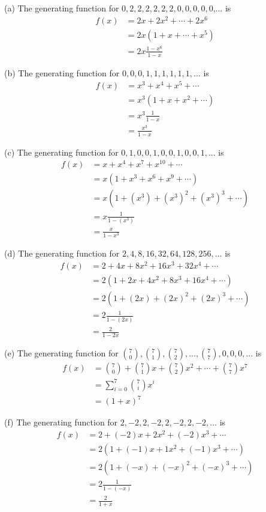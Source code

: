 
(a)
The generating function for
$0, 2, 2, 2, 2, 2, 2, 0, 0, 0, 0, 0$,... is
\begin{align*}
f(x) &= 2x + 2x^2 + \cdots + 2x^6 \\
     &= 2x(1 + x + \cdots + x^5) \\
     &= 2x\frac{1 - x^6}{1 - x}
\end{align*}


(b)
The generating function for
$0, 0, 0, 1, 1, 1, 1, 1, 1,...$ is
\begin{align*}
f(x) &= x^3 + x^4 + x^5 + \cdots \\
     &= x^3(1 + x + x^2 + \cdots) \\
     &= x^3\frac{1}{1 - x} \\
     &= \frac{x^3}{1 - x}
\end{align*}


(c)
The generating function for
$0, 1, 0, 0, 1, 0, 0, 1, 0, 0, 1, ...$ is
\begin{align*}
f(x) &= x + x^4 + x^7 + x^{10} + \cdots \\
     &= x(1 + x^3 + x^6 + x^{9} + \cdots) \\
     &= x(1 + (x^3) + (x^3)^2 + (x^{3})^3 + \cdots) \\
     &= x\frac{1}{1 - (x^3)} \\
     &= \frac{x}{1 - x^3}
\end{align*}


(d)
The generating function for
$2, 4, 8, 16, 32, 64, 128, 256,...$ is
\begin{align*}
f(x) &= 2 + 4x + 8x^2 + 16x^3 + 32x^{4} + \cdots \\
     &= 2(1 + 2x + 4x^2 + 8x^{3} + 16x^4 + \cdots) \\
     &= 2(1 + (2x) + (2x)^2 + (2x)^3 + \cdots) \\
     &= 2\frac{1}{1 - (2x)} \\
     &= \frac{2}{1 - 2x}
\end{align*}


(e)
The generating function for
$\binom{7}{0}, \binom{7}{1}, \binom{7}{2}, ..., \binom{7}{7}, 0, 0, 0, ...$ is
\begin{align*}
f(x) &= \binom{7}{0} + \binom{7}{1}x + \binom{7}{2}x^2 + \cdots
        + \binom{7}{7}x^7 \\
     &= \sum_{i=0}^7 \binom{7}{i} x^i \\
     &= (1 + x)^7
\end{align*}


(f)
The generating function for
$2, -2, 2, -2, 2, -2, 2, -2, ...$ is
\begin{align*}
f(x) &= 2 + (-2)x + 2x^2 + (-2)x^3 + \cdots \\
     &= 2 ( 1 + (-1)x + 1x^2 + (-1)x^3 + \cdots ) \\
     &= 2 ( 1 + (-x) + (-x)^2 + (-x)^3 + \cdots ) \\
     &= 2 \frac{1}{1 - (-x)} \\
     &= \frac{2}{1 + x} 
\end{align*}


